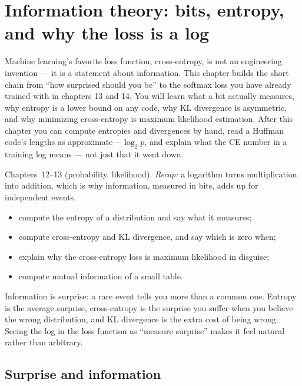 \chapter{Information theory: bits, entropy, and why the loss is a log}\label{ch:info}

Machine learning's favorite loss function, cross-entropy, is not an
engineering invention --- it is a statement about information. This
chapter builds the short chain from ``how surprised should you be'' to
the softmax loss you have already trained with in chapters 13 and 14.
You will learn what a bit actually measures, why entropy is a lower
bound on any code, why KL divergence is asymmetric, and why minimizing
cross-entropy is maximum likelihood estimation. After this chapter you
can compute entropies and divergences by hand, read a Huffman code's
lengths as approximate $-\log_2 p$, and explain what the CE number in a
training log means --- not just that it went down.

\begin{rulebox}
Chapters~12--13 (probability, likelihood). \emph{Recap:} a logarithm turns multiplication into addition, which is why information, measured in bits, adds up for independent events.
\end{rulebox}
\begin{wins}
\begin{itemize}
\item compute the entropy of a distribution and say what it measures;
\item compute cross-entropy and KL divergence, and say which is zero when;
\item explain why the cross-entropy loss is maximum likelihood in disguise;
\item compute mutual information of a small table.
\end{itemize}
\end{wins}
\begin{principle}
Information is surprise: a rare event tells you more than a common one. Entropy is the average surprise, cross-entropy is the surprise you suffer when you believe the wrong distribution, and KL divergence is the extra cost of being wrong. Seeing the log in the loss function as ``measure surprise'' makes it feel natural rather than arbitrary.
\end{principle}

\section{Surprise and information}\label{sec:info-surprise}

